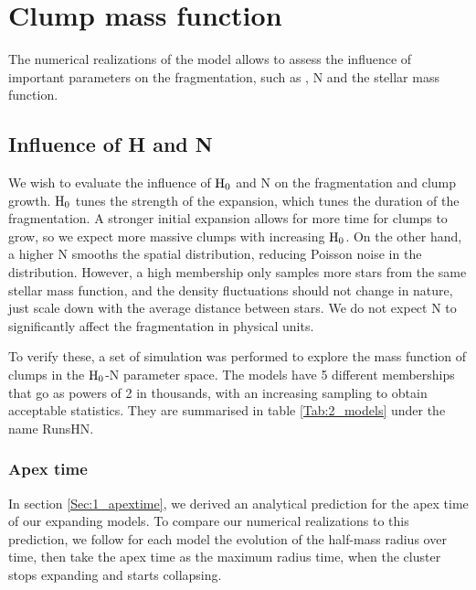    
   
   
\section{Clump mass function}

The numerical realizations of the \HubLem model allows to assess the influence of important parameters on the fragmentation, such as \tHub, N and the stellar mass function. 


\subsection{Influence of H and N}

We wish to evaluate the influence of ${\textrm{H}}_0$ and N on the fragmentation and clump growth. ${\textrm{H}}_0$ tunes the strength of the expansion, which tunes the duration of the fragmentation. A stronger initial expansion allows for more time for clumps to grow, so we expect more massive clumps with increasing ${\textrm{H}}_0$. On the other hand, a higher N smooths the spatial distribution, reducing Poisson noise in the  distribution. However, a high membership only samples more stars from the same stellar mass function, and the density fluctuations should not change in nature, just scale down with the average distance between stars.  We do not expect N to significantly affect the fragmentation in physical units. 

To verify these, a set of simulation was performed to explore the mass function of clumps in the ${\textrm{H}}_0$-N parameter space. The models have 5 different memberships that go as powers of 2 in thousands, with an increasing sampling to obtain acceptable statistics. They are summarised in table \ref{Tab:2_models} under the name RunsHN.


\subsubsection*{Apex time}
In section \ref{Sec:1_apextime}, we derived an analytical prediction for the apex time of our expanding models. To compare our numerical realizations to this prediction,  we follow for each model the evolution of the half-mass radius over time, then take the apex time as the maximum radius time, when the cluster stops expanding and starts collapsing. 


